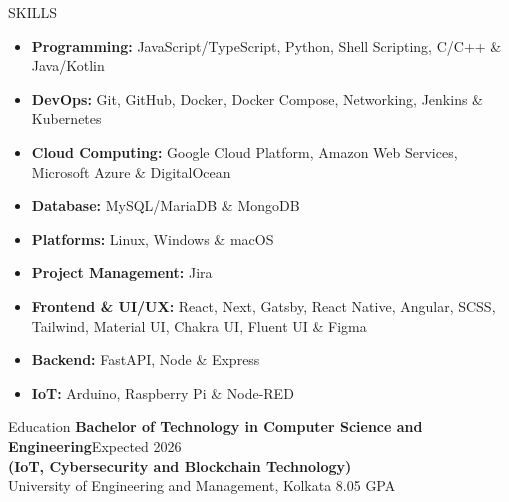\documentclass{resume}
\begin{document}
\vspace{-0.4em}
\begin{rSection}{SKILLS}
  \begin{itemize}
    \item \textbf{Programming:} JavaScript/TypeScript, Python, Shell Scripting, C/C++ \& Java/Kotlin
          \vspace{-0.2em}
    \item \textbf{DevOps:} Git, GitHub, Docker, Docker Compose, Networking, Jenkins \& Kubernetes
          \vspace{-0.2em}
    \item \textbf{Cloud Computing:} Google Cloud Platform, Amazon Web Services, Microsoft Azure \& DigitalOcean
          \vspace{-0.2em}
    \item \textbf{Database:} MySQL/MariaDB \& MongoDB
          \vspace{-0.2em}
    \item \textbf{Platforms:} Linux, Windows \& macOS
    \item \textbf{Project Management:} Jira
          \vspace{-0.2em}
    \item \textbf{Frontend \& UI/UX:} React, Next, Gatsby, React Native, Angular, SCSS, Tailwind, Material UI, Chakra UI, Fluent UI \& Figma
          \vspace{-0.2em}
    \item \textbf{Backend:} FastAPI, Node \& Express
          \vspace{-0.2em}
    \item \textbf{IoT:} Arduino, Raspberry Pi \& Node-RED
  \end{itemize}
\end{rSection}
\vspace{-0.4em}
\begin{rSection}{Education}
  \textbf{Bachelor of Technology in Computer Science and Engineering}\hfill {Expected 2026}\\
  \textbf{(IoT, Cybersecurity and Blockchain Technology)}\\
  University of Engineering and Management, Kolkata \hfill  8.05 GPA
\end{rSection}
\vspace{-0.4em}
\end{document}
